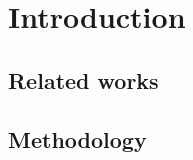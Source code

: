 
\begin{abstract}

\end{abstract}



\section{Introduction}

\subsection{Related works}

\subsection{Methodology}
